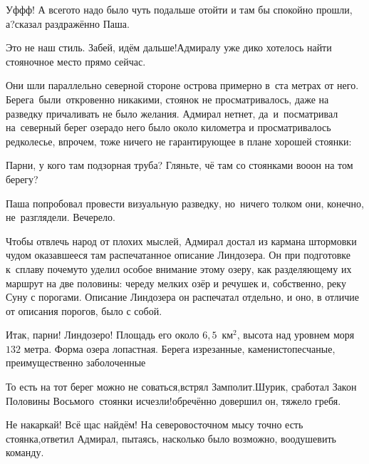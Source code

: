 \diagdash Уф\sdash ф\sdash ф! А всего\sdash то надо было чуть подальше отойти и там бы спокойно прошли, а?\mdash сказал раздражённо Паша.

\diagdash Это не наш стиль. Забей, идём дальше!\mdash Адмиралу уже дико хотелось найти стояночное место прямо сейчас. 

Они шли параллельно северной стороне острова примерно в~ста метрах от него. Берега~были~откровенно никакими, стоянок не просматривалось, даже на разведку причаливать не было желания. Адмирал нет\sdash нет, да~и~посматривал на~северный берег озера\mdash до него было около километра и просматривалось редколесье, впрочем, тоже ничего не гарантирующее в плане хорошей стоянки:

\diagdash Парни, у кого там подзорная труба? Гляньте, чё там со стоянками во\sdash о\sdash он на том берегу?

Паша попробовал провести визуальную разведку, но~ничего толком они, конечно, не~разглядели. Вечерело.

Чтобы отвлечь народ от плохих мыслей, Адмирал достал из кармана штормовки чудом оказавшееся там распечатанное описание Линдозера. Он при подготовке к~сплаву почему\sdash то уделил особое внимание этому озеру, как разделяющему их маршрут на две половины: череду мелких озёр и речушек и, собственно, реку Суну с порогами. Описание Линдозера он распечатал отдельно, и оно, в отличие от описания порогов, было с собой.

\diagdash Итак, парни! Линдозеро! Площадь его около $6,5$~км$^2$, высота над уровнем моря $132$ метра. Форма озера лопастная. Берега изрезанные, каменисто\sdash песчаные, преимущественно заболоченные\myldots{}

\diagdash То есть на тот берег можно не соваться,\mdash встрял Замполит.\mdash Шурик, сработал Закон Половины Восьмого~\cite{Квадригин}\mdash стоянки исчезли!\mdash обречённо довершил он, тяжело гребя.



\diagdash Не накаркай! Всё щас найдём! На северо\sdash восточном мысу точно есть стоянка,\mdash ответил Адмирал, пытаясь, насколько было возможно, воодушевить команду.

